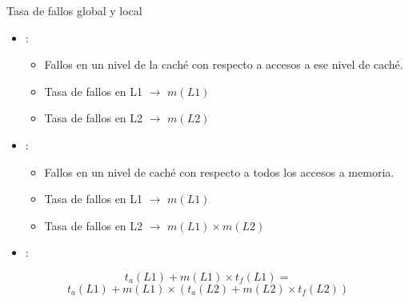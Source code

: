 \begin{frame}[t]{Tasa de fallos global y local}
\begin{itemize}
  \item {}:
    \begin{itemize}
      \item Fallos en un nivel de la caché con respecto a accesos a ese nivel de caché.
      \item Tasa de fallos en L1 $\rightarrow$ $m(L1)$
      \item Tasa de fallos en L2 $\rightarrow$ $m(L2)$
    \end{itemize}

  \item {}:
    \begin{itemize}
      \item Fallos en un nivel de caché con respecto a todos los accesos a memoria.
      \item Tasa de fallos en L1 $\rightarrow$ $m(L1)$
      \item Tasa de fallos en L2 $\rightarrow$ $m(L1) \times m(L2)$
    \end{itemize}

  \item {}:
\end{itemize}
\[
t_a(L1) + m(L1) \times t_f(L1) =
\]
\[
t_a(L1) + m(L1) \times \left( t_a(L2) + m(L2) \times t_f(L2) \right)
\]
\end{frame}

